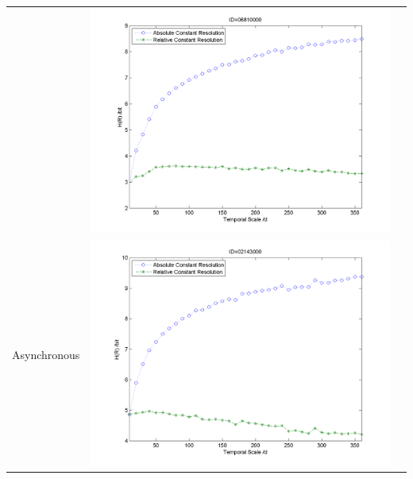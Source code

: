 \documentclass[11pt]{article}
\begin{document}
\begin{table}[H]
{\begin{tabular}{ccc}
&\begin{minipage}{.6\textwidth}\includegraphics[width=\linewidth]{resultgraph/e06810000.png}\end{minipage}
\\
Asynchronous
&\begin{minipage}{.6\textwidth}\includegraphics[width=\linewidth]{resultgraph/e02143000.png}\end{minipage}
 

\end{tabular}}
\end{table}
\end{document}
